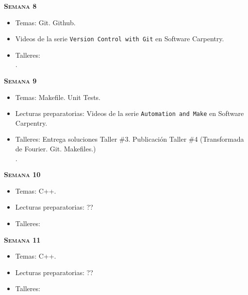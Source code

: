 \documentclass[letterpaper,10pt,onecolumn]{article}
\begin{document}
\noindent\textbf{\textsc{Semana 8}}\\[-0.5cm]
\begin{itemize}
\item Temas: Git. Github. \\[-0.6cm]
\item Videos de la serie \texttt{Version Control with Git} en
  Software Carpentry.\\[-0.6cm]   
\item Talleres:\\[-0.6cm]. 
\end{itemize}

\noindent\textbf{\textsc{Semana 9}}\\[-0.5cm]
\begin{itemize}
\item Temas: Makefile. Unit Tests. \\[-0.6cm]
\item Lecturas preparatorias: Videos de la serie \texttt{Automation
  and Make} en Software Carpentry. \\[-0.6cm]
\item Talleres: 
Entrega soluciones Taller \#3. 
Publicaci\'on Taller \#4 
(Transformada de Fourier. Git. Makefiles.)
\\[-0.6cm]. 
\end{itemize}



\noindent\textbf{\textsc{Semana 10}}\\[-0.5cm]
\begin{itemize}
\item Temas: C++. \\[-0.6cm]
\item Lecturas preparatorias: ??\\[-0.6cm]
\item Talleres: 
\\[-0.6cm]
\end{itemize}


\noindent\textbf{\textsc{Semana 11}}\\[-0.5cm]
\begin{itemize}
\item Temas: C++. \\[-0.6cm]
\item Lecturas preparatorias: ??\\[-0.6cm]
\item Talleres: 
\\[-0.6cm]
\end{itemize}
\end{document}
